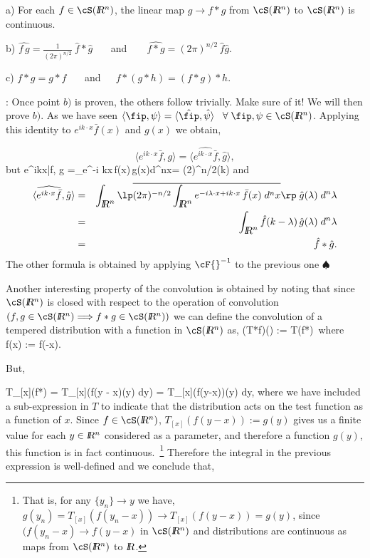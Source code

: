 \bteo

\noi a) For each $f\in\cS(\ren{})$, the linear map $g\to f*g$ from $\cS(\ren{})$ 
to $\cS(\ren{})$ is continuous.

\noi b) $\widehat{f\,g}=\frac1{(2\pi)^{n/2}}\:\hat f*\hat g$ \ \ \ and\
\ \ \  $\widehat{f*g}
=(2\pi)^{n/2}\,\hat f\hat g$.

\noi c) $f*g=g*f$ \ \ \ and\ \ \  $f*(g*h)=(f*g)*h.$
\eteo

\pru:
Once point $b)$ is proven, the others follow
trivially. Make sure of it! 
We will then prove $b)$.
As we have seen $\langle \fip,\psi \rangle = \langle \hat{\fip},\hat\psi \rangle \;\;\;\forall\;
\fip,\psi\in\cS(\ren{})$. 
Applying this identity to $e^{ik\cdot x}\bar
f(x)$ and $g(x)$ we obtain,
 
\[
\langle e^{ik\cdot x} \bar{f} ,g \rangle = 
\langle \widehat{e^{i k\cdot x}\bar f},\hat g \rangle ,
\] 
%
but
\beq
\langle e^{ik\cdot x}\bar f, g \rangle =\int_{\ren{}}e^{-i k\cdot x}\,f(x)\,g(x)\;d^{n}x=
(2\pi)^{n/2}\;\widehat{fg}(k)
\eeq
\noi 
and
\begin{eqnarray}
\langle \widehat{e^{i k\cdot x} \bar{f}},\hat g \rangle &=&\int_{\ren{}}\lp\overline{
(2\pi)^{-n/2}\int_{\ren{}}e^{-i\lambda\cdot x + i k\cdot x}\,\bar
f(x)\;d^nx}\rp\;\hat g(\lambda)\;d^n\lambda \nonumber \\
&=&\int_{\ren{}}\hat f(k-\lambda)\,\hat g(\lambda)\;d^n\lambda \nonumber \\
&=&\hat f*\hat g.
\end{eqnarray}
%
The other formula is obtained by applying $\cF{}^{-1}$ to the previous one $\spadesuit$

Another interesting property of the convolution is obtained by noting
that since $\cS(\ren{})$ is closed with respect to the operation of
convolution $(f,g\in\cS(\ren{})\Longrightarrow f*g\in\cS(\ren{}))$
we can define the convolution of a tempered distribution with
a function in $\cS(\ren{})$ as,
\beq
(T*f)(\fip) := T(\ti f*\fip)\;\;\;\mbox{ where } \ti f(x) := f(-x).
\label{10.t**}
\eeq
 
\noi But,

\beq
T_{[x]}(\ti f*\fip) = T_{[x]}(\int f(y - x)\phi(y) \; dy) = \int T_{[x]}(f(y-x))\phi(y) \; dy,
\eeq
%
where we have included a sub-expression in $T$ to indicate that the distribution acts on the test function as a function of $x$.
Since $f \in \cS(\ren{})$, $T_{[x]}(f(y-x)) :=g(y)$ gives us a finite value for each $y \in \mbox{\sl {l$\!\!\!\;\:\!$R}$^n$}{}$ considered as a parameter, and therefore a function $g(y)$, this function is in fact continuous.~\footnote{That is, for any $\{y_{n}\} \to y$ we have, $g(y_{n}) = T_{[x]}(f(y_{n}-x)) \to T_{[x]}(f(y-x)) = g(y)$, since $(f(y_{n}-x) \to f(y-x)$ in $\cS(\ren{})$ and distributions are continuous as maps from $\cS(\ren{})$ to $\mbox{\sl {l$\!\!\!\;\:\!$R}}$.} Therefore the integral in the previous expression is well-defined and we conclude that,

